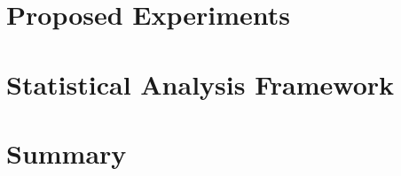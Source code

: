 \section{Proposed Experiments}
\label{sec:exp-proposed}


\section{Statistical Analysis Framework}
\label{sec:exp-stats}


\section{Summary}
\label{sec:exp-summary}

